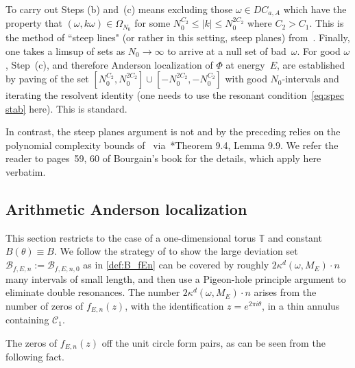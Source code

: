 \documentclass[11pt]{amsart}
\newcommand{\T}{\mathbb T}
\begin{document}
To carry out Steps (b) and~(c) means excluding those $\omega\in  DC_{a,A}$ which have the property that $(\omega, k\omega)\in \Omega_{N_0}$ for some $N_0^{C_2}\le |k|\le  N_0^{2C_2}$ where $C_2>C_1$. This is the method of ``steep lines" (or rather in this setting, steep planes) from~\cite{BG}. Finally, one takes a limsup of sets as $N_0\to\infty$ to arrive at a null set of bad~$\omega$. For good $\omega$, Step~(c), and therefore Anderson localization of $\Phi$ at energy~$E$, are established by paving of the set $[N_0^{C_2}, N_0^{2C_2}]\cup [-N_0^{2C_2}, -N_0^{C_2}] $ with good $N_0$-intervals and iterating the resolvent identity (one needs to use the resonant condition~\eqref{eq:spec stab} here). This is standard. 

In contrast,  the steep planes argument is not and by the preceding relies  on the polynomial complexity bounds of~\cite{BN} via~\cite{B}*{Theorem 9.4, Lemma 9.9}.  We refer the reader to pages~59, 60 of Bourgain's book for the details, which apply here verbatim.  


 
\subsection{Arithmetic Anderson localization}\label{sec:AL_arithmetic}

This section restricts to the case of a one-dimensional torus $\T$ and constant $B(\theta)\equiv B$.
We follow the strategy of \cite{HS2} to show the large deviation set $\mathcal{B}_{f,E,n}:=\mathcal{B}_{f,E,n,0}$ as in \eqref{def:B_fEn} can be covered by roughly $2\kappa^d(\omega,M_E)\cdot n$ many intervals of small length, and then use a Pigeon-hole principle argument to eliminate double resonances.
The number $2\kappa^d(\omega,M_E)\cdot n$ arises from the number of zeros of $f_{E,n}(z)$, with the identification $z=e^{2\pi i\theta}$, in a thin annulus containing $\mathcal{C}_1$.

The zeros of $f_{E,n}(z)$ off the unit circle form pairs, as can be seen from the following fact. 
\end{document}
